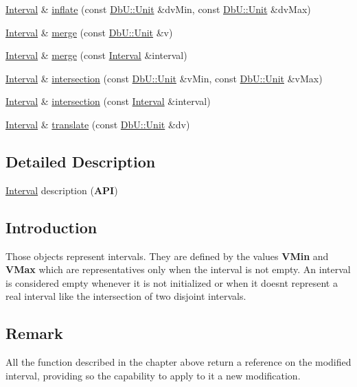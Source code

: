 \begin{DoxyCompactItemize}
\item 
\hyperlink{classHurricane_1_1Interval}{Interval} \& \hyperlink{classHurricane_1_1Interval_ac311880a39d8e3db79bcbc5d3bb341a6}{inflate} (const \hyperlink{group__DbUGroup_ga4fbfa3e8c89347af76c9628ea06c4146}{Db\+U\+::\+Unit} \&dv\+Min, const \hyperlink{group__DbUGroup_ga4fbfa3e8c89347af76c9628ea06c4146}{Db\+U\+::\+Unit} \&dv\+Max)
\item 
\hyperlink{classHurricane_1_1Interval}{Interval} \& \hyperlink{classHurricane_1_1Interval_a927e2fbaa8f38a069c6308f7cacc8ab5}{merge} (const \hyperlink{group__DbUGroup_ga4fbfa3e8c89347af76c9628ea06c4146}{Db\+U\+::\+Unit} \&v)
\item 
\hyperlink{classHurricane_1_1Interval}{Interval} \& \hyperlink{classHurricane_1_1Interval_ab6c2a46d4cb528ecb0d0eec2c4cec020}{merge} (const \hyperlink{classHurricane_1_1Interval}{Interval} \&interval)
\item 
\hyperlink{classHurricane_1_1Interval}{Interval} \& \hyperlink{classHurricane_1_1Interval_a0eeaaa7eb5b4ade89719c57a2c284909}{intersection} (const \hyperlink{group__DbUGroup_ga4fbfa3e8c89347af76c9628ea06c4146}{Db\+U\+::\+Unit} \&v\+Min, const \hyperlink{group__DbUGroup_ga4fbfa3e8c89347af76c9628ea06c4146}{Db\+U\+::\+Unit} \&v\+Max)
\item 
\hyperlink{classHurricane_1_1Interval}{Interval} \& \hyperlink{classHurricane_1_1Interval_a568a1e327e5e13d4b50ea16dab20b835}{intersection} (const \hyperlink{classHurricane_1_1Interval}{Interval} \&interval)
\item 
\hyperlink{classHurricane_1_1Interval}{Interval} \& \hyperlink{classHurricane_1_1Interval_aa2924c14832fd643bec8e8682faf7854}{translate} (const \hyperlink{group__DbUGroup_ga4fbfa3e8c89347af76c9628ea06c4146}{Db\+U\+::\+Unit} \&dv)
\end{DoxyCompactItemize}


\subsection{Detailed Description}
\hyperlink{classHurricane_1_1Interval}{Interval} description ({\bfseries A\+PI}) 

\hypertarget{classHurricane_1_1Interval_secIntervalIntro}{}\subsection{Introduction}\label{classHurricane_1_1Interval_secIntervalIntro}
Those objects represent intervals. They are defined by the values {\bfseries V\+Min} and {\bfseries V\+Max} which are representatives only when the interval is not empty. An interval is considered empty whenever it is not initialized or when it doesn\textquotesingle{}t represent a real interval like the intersection of two disjoint intervals.\hypertarget{classHurricane_1_1Interval_secIntervalRemark}{}\subsection{Remark}\label{classHurricane_1_1Interval_secIntervalRemark}
All the function described in the chapter above return a reference on the modified interval, providing so the capability to apply to it a new modification. 

